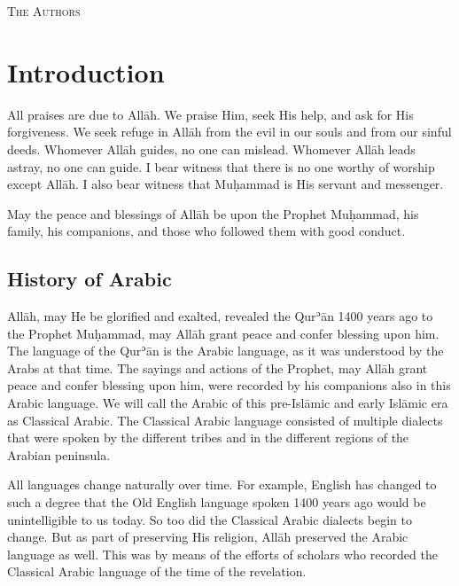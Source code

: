 \documentclass[
  10pt,
]{book}
\begin{document}
\textsc{The Authors}

\chapter{Introduction}\label{introduction}

All praises are due to Allāh. We praise Him, seek His help, and ask for His forgiveness. We seek refuge in Allāh from the evil in our souls and from our sinful deeds. Whomever Allāh guides, no one can mislead. Whomever Allāh leads astray, no one can guide. I bear witness that there is no one worthy of worship except Allāh. I also bear witness that Muḥammad is His servant and messenger.

May the peace and blessings of Allāh be upon the Prophet Muḥammad, his family, his companions, and those who followed them with good conduct.

\section{History of Arabic}\label{history-of-arabic}

Allāh, may He be glorified and exalted, revealed the Qurʾān 1400 years ago to the Prophet Muḥammad, may Allāh grant peace and confer blessing upon him. The language of the Qurʾān is the Arabic language, as it was understood by the Arabs at that time.
The sayings and actions of the Prophet, may Allāh grant peace and confer blessing upon him, were recorded by his companions also in this Arabic language.
We will call the Arabic of this pre-Islāmic and early Islāmic era as Classical Arabic.
The Classical Arabic language consisted of multiple dialects that were spoken by the different tribes and in the different regions of the Arabian peninsula.

All languages change naturally over time. For example, English has changed to such a degree that the Old English language spoken 1400 years ago would be unintelligible to us today. So too did the Classical Arabic dialects begin to change. But as part of preserving His religion, Allāh preserved the Arabic language as well. This was by means of the efforts of scholars who recorded the Classical Arabic language of the time of the revelation.
\end{document}
